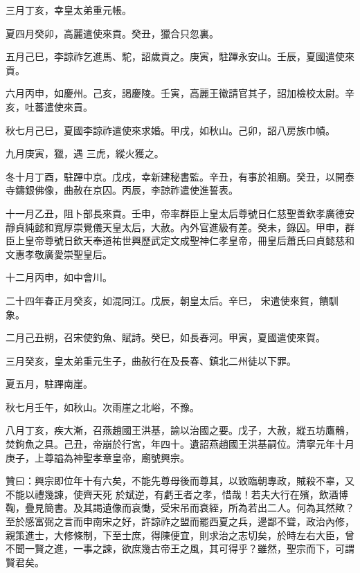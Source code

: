 \begin{pinyinscope}
 三月丁亥，幸皇太弟重元帳。



 夏四月癸卯，高麗遣使來貢。癸丑，獵合只忽裏。



 五月己巳，李諒祚乞進馬、駝，詔歲貢之。庚寅，駐蹕永安山。壬辰，夏國遣使來貢。



 六月丙申，如慶州。己亥，謁慶陵。壬寅，高麗王徽請官其子，詔加檢校太尉。辛亥，吐蕃遣使來貢。



 秋七月己巳，夏國李諒祚遣使來求婚。甲戌，如秋山。己卯，詔八房族巾幘。



 九月庚寅，獵，遇
 三虎，縱火獲之。



 冬十月丁酉，駐蹕中京。戊戌，幸新建秘書監。辛丑，有事於祖廟。癸丑，以開泰寺鑄銀佛像，曲赦在京囚。丙辰，李諒祚遣使進誓表。



 十一月乙丑，阻卜部長來貢。壬申，帝率群臣上皇太后尊號日仁慈聖善欽孝廣德安靜貞純懿和寬厚崇覺儀天皇太后，大赦。內外官進級有差。癸未，錄囚。甲申，群臣上皇帝尊號日欽天奉道祐世興歷武定文成聖神仁孝皇帝，冊皇后蕭氏曰貞懿慈和文惠孝敬廣愛崇聖皇后。



 十二月丙申，如中會川。



 二十四年春正月癸亥，如混同江。戊辰，朝皇太后。辛巳，
 宋遣使來賀，饋馴象。



 二月己丑朔，召宋使釣魚、賦詩。癸巳，如長春河。甲寅，夏國遣使來賀。



 三月癸亥，皇太弟重元生子，曲赦行在及長春、鎮北二州徒以下罪。



 夏五月，駐蹕南崖。



 秋七月壬午，如秋山。次雨崖之北峪，不豫。



 八月丁亥，疾大漸，召燕趙國王洪基，諭以治國之要。戊子，大赦，縱五坊鷹鶻，焚鉤魚之具。己丑，帝崩於行宮，年四十。遺詔燕趙國王洪基嗣位。清寧元年十月庚子，上尊謚為神聖孝章皇帝，廟號興宗。



 贊曰：興宗即位年十有六矣，不能先尊母後而尊其，以致臨朝專政，賊殺不辜，又不能以禮幾諫，使齊天死
 於斌逆，有虧王者之孝，惜哉！若夫大行在殯，飲酒博鞠，疊見簡書。及其謁遺像而哀慟，受宋吊而衰絰，所為若出二人。何為其然歟？至於感富弼之言而申南宋之好，許諒祚之盟而罷西夏之兵，邊鄙不聳，政治內修，親策進士，大修條制，下至士庶，得陳便宜，則求治之志切矣，於時左右大臣，曾不聞一賢之進，一事之諫，欲庶幾古帝王之風，其可得乎？雖然，聖宗而下，可謂賢君矣。



\end{pinyinscope}